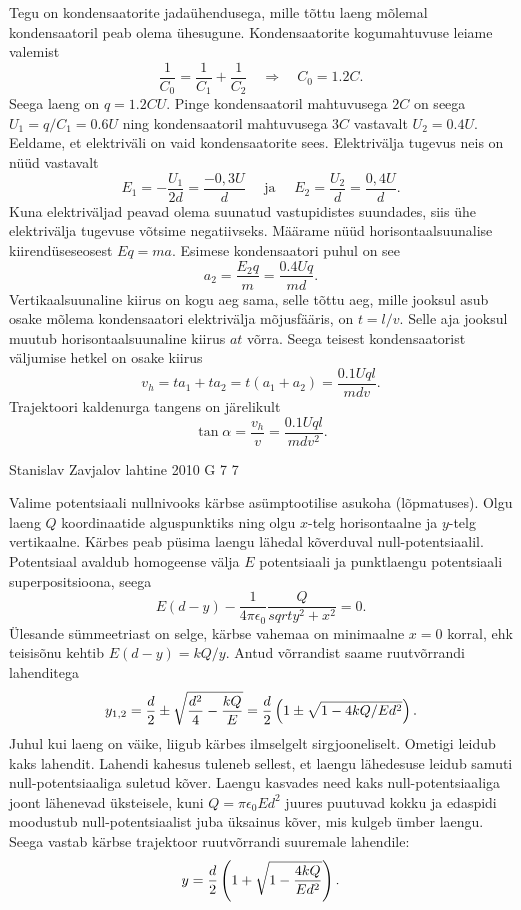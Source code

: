 \documentclass[11pt, twoside]{article}
\begin{document}
{{\ifSolution
Tegu on kondensaatorite jadaühendusega, mille tõttu laeng mõlemal kondensaatoril peab olema ühesugune. Kondensaatorite kogumahtuvuse leiame valemist 
\[
\frac{1}{C_{0}}=\frac{1}{C_{1}}+\frac{1}{C_{2}} \quad \Rightarrow \quad C_{0}=\num{1,2} C.
\]
Seega laeng on $q = \num{1,2}CU$. Pinge kondensaatoril mahtuvusega $2C$ on seega $U_1 = q/C_1 = \num{0,6}U$ ning kondensaatoril mahtuvusega $3C$ vastavalt $U_2 = \num{0,4}U$. Eeldame, et elektriväli on vaid kondensaatorite sees. Elektrivälja tugevus neis on nüüd vastavalt
\[
E_{1}=-\frac{U_{1}}{2 d}=\frac{-0,3 U}{d} \quad \text { ja } \quad E_{2}=\frac{U_{2}}{d}=\frac{0,4 U}{d}.
\]
Kuna elektriväljad peavad olema suunatud vastupidistes suundades, siis ühe elektrivälja tugevuse võtsime negatiivseks. Määrame nüüd horisontaalsuunalise kiirendüseseosest $Eq = ma$. Esimese kondensaatori puhul on see
\[
a_{2}=\frac{E_{2} q}{m}=\frac{\num{0,4} U q}{m d}.
\]
Vertikaalsuunaline kiirus on kogu aeg sama, selle tõttu aeg, mille jooksul asub osake mõlema kondensaatori elektrivälja mõjusfääris, on $t = l/v$. Selle aja jooksul muutub horisontaalsuunaline kiirus $at$ võrra. Seega teisest kondensaatorist väljumise hetkel on osake kiirus
\[
v_{h}=t a_{1}+t a_{2}=t\left(a_{1}+a_{2}\right)=\frac{\num{0,1} U q l}{m d v}.
\]
Trajektoori kaldenurga tangens on järelikult
\[
\tan \alpha = \frac{v_h}{v} = \frac{\num{0,1}Uql}{mdv^2}.
\]
\fi
}

{Stanislav Zavjalov} %
{lahtine} %
{2010} %
{G 7} %
{7} %
{

\ifSolution
Valime potentsiaali nullnivooks kärbse asümptootilise asukoha (lõpmatuses). 
Olgu laeng $Q$ koordinaatide alguspunktiks ning olgu $x$-telg horisontaalne ja $y$-telg vertikaalne. 
Kärbes peab püsima laengu lähedal kõverduval null-potentsiaalil. 
Potentsiaal avaldub homogeense välja $E$ potentsiaali ja punktlaengu potentsiaali superpositsioona, seega 
\[
E(d - y) - \frac{1}{4\pi\epsilon_0}\frac{Q}{sqrt{y^2 + x^2}} = 0.
\]
Ülesande sümmeetriast on selge, kärbse vahemaa on minimaalne $x=0$ korral, ehk teisisõnu kehtib $E(d-y) = kQ/y$. Antud võrrandist saame ruutvõrrandi lahenditega
\[
y_{1,2} = {d \over 2} \pm \sqrt{\frac {d^2}4 - {kQ \over E}} = {d \over 2}\left( 1 \pm \sqrt{1 - 4kQ / Ed^2}\right).
\] 
Juhul kui laeng on väike, liigub kärbes ilmselgelt sirgjooneliselt. Ometigi leidub kaks lahendit. Lahendi kahesus tuleneb sellest, et laengu lähedesuse leidub samuti
null-potentsiaaliga suletud kõver. Laengu kasvades need kaks null-potentsiaaliga joont lähenevad üksteisele, kuni $Q=\pi\epsilon_0Ed^2$ juures 
puutuvad kokku ja edaspidi moodustub null-potentsiaalist juba üksainus kõver, mis kulgeb ümber laengu. 
Seega vastab kärbse trajektoor ruutvõrrandi suuremale lahendile:
$$y= {d \over 2}\left(1 + \sqrt{1 - {4kQ \over Ed^2}}\right).$$ 
\fi
}

}
\end{document}
